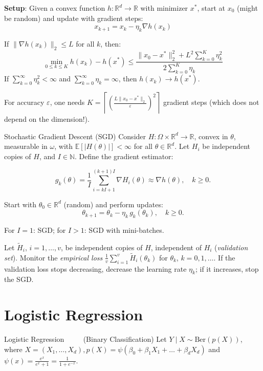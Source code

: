 \documentclass[a4paper,10pt]{article}
\begin{document}
\begin{small}
\textbf{Setup}: Given a convex function \( h: \mathbb{R}^d \to \mathbb{R} \) with minimizer \( x^* \), start at \( x_0 \) (might be random) and update with gradient steps:
\[
x_{k+1} = x_k - \eta_k \nabla h(x_k)
\]

If $\|\nabla h(x_k)\|_2 \leq L$  for all  $k$, then:
\[
\min_{0 \leq k \leq K} h(x_k) - h(x^*) \leq \frac{\|x_0 - x^*\|_2^2 + L^2 \sum_{k=0}^{K} \eta_k^2}{2 \sum_{k=0}^{K} \eta_k}
\]
If \( \sum_{k=0}^\infty \eta_k^2 < \infty \) and \( \sum_{k=0}^\infty \eta_k = \infty \), then \( h(x_k) \to h(x^*) \).

For accuracy $\varepsilon$, one needs $K = \left\lceil \left( \frac{L \| x_0 - x^* \|_2}{\varepsilon} \right)^2 \right\rceil$ gradient steps (which does not depend on the dimension!).

\begin{subbox}{Stochastic Gradient Descent (SGD)}
Consider $ H : \Omega \times \mathbb{R}^d \to \mathbb{R} $, convex in $ \theta $, measurable in $ \omega $, with $ \mathbb{E}[|H(\theta)|] < \infty $ for all $ \theta \in \mathbb{R}^d $. Let $ H_i $ be independent copies of $ H $, and $ I \in \mathbb{N} $. Define the gradient estimator:

$$
g_k(\theta) = \frac{1}{I} \sum_{i=kI+1}^{(k+1)I} \nabla H_i(\theta) \approx \nabla h(\theta), \quad k \geq 0.
$$

Start with $ \theta_0 \in \mathbb{R}^d $ (random) and perform updates:
$$
\theta_{k+1} = \theta_k - \eta_k \, g_k(\theta_k), \quad k \geq 0.
$$

For $ I = 1 $: SGD; for $ I > 1 $: SGD with mini-batches.

\end{subbox}

Let $\widetilde{H}_i$, $i = 1,\dots,v$, be independent copies of $H$, independent of $H_i$ (\textit{validation set}). Monitor the \textit{empirical loss} $\frac{1}{v} \sum_{i=1}^{v} \widetilde{H}_i(\theta_k)$ for $\theta_k$, $k = 0,1,\dots$. If the validation loss stops decreasing, decrease the learning rate $\eta_k$; if it increases, stop the SGD.

\section{Logistic Regression }

\begin{subbox}{Logistic Regression $\quad \quad$ (Binary Classification)}
    Let $Y \mid X \sim \text{Ber}(p(X))$, where $X = (X_1, \dots, X_d), p(X) = \psi\left(\beta_0 + \beta_1 X_1 + \dots + \beta_d X_d\right)$ and $\psi(x) = \frac{e^x}{e^x + 1} = \frac{1}{1 + e^{-x}}$.


\end{subbox}
\end{small}
\end{document}
